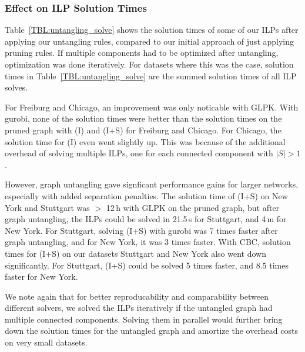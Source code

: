 \documentclass[format=acmsmall, review=false, screen=true]{acmart}
\begin{document}
\subsubsection{Effect on ILP Solution Times}

Table~\ref{TBL:untangling_solve} shows the solution times of some of our ILPs after applying our untangling rules, compared to our initial approach of just applying pruning rules.
If multiple components had to be optimized after untangling, optimization was done iteratively.
For datasets where this was the case, solution times in Table~\ref{TBL:untangling_solve} are the summed solution times of all ILP solves.

For Freiburg and Chicago, an improvement was only noticable with GLPK.
With gurobi, none of the solution times were better than the solution times on the pruned graph with (I) and (I+S) for Freiburg and Chicago.
For Chicago, the solution time for (I) even went slightly up.
This was because of the additional overhead of solving multiple ILPs, one for each connected component with $|S| > 1$.

However, graph untangling gave signficant performance gains for larger networks, especially with added separation penalties.
The solution time of (I+S) on New York and Stuttgart was $>$ 12\,h with GLPK on the pruned graph, but after graph untangling, the ILPs could be solved in 21.5\,s for Stuttgart, and 4\,m for New York.
For Stuttgart, solving (I+S) with gurobi was 7 times faster after graph untangling, and for New York, it was 3 times faster.
With CBC, solution times for (I+S) on our datasets Stuttgart and New York also went down significantly. For Stuttgart, (I+S) could be solved 5 times faster, and 8.5 times faster for New York.

We note again that for better reproducability and comparability between different solvers, we solved the ILPs iteratively if the untangled graph had multiple connected components. Solving them in parallel would further bring down the solution times for the untangled graph and amortize the overhead costs on very small datasets.
\end{document}
